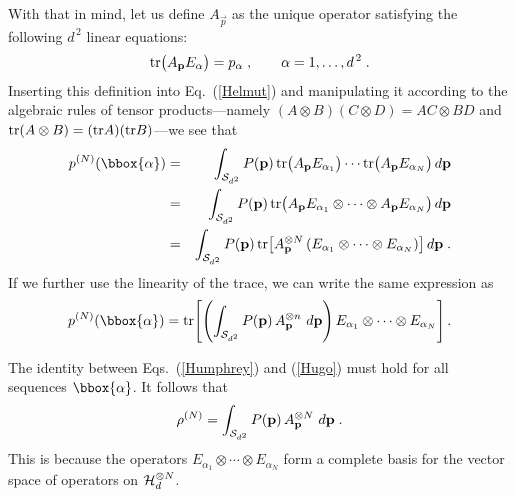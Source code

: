 With that in mind, let us define $A_{\vec{p}}$ as the unique
operator satisfying the following $d^{\,2}$ linear equations:
\begin{equation}
{\rm tr}\big(A_{\vec{p}}E_\alpha\big)=
p_\alpha\;,\quad\quad\alpha=1,\ldots,d^{\,2}\;.
\label{Hamish}
\end{equation}
Inserting this definition into Eq.~(\ref{Helmut}) and manipulating it
according to the algebraic rules of tensor products---namely
$(A\otimes B)(C\otimes D)=AC\otimes BD$ and ${\rm tr}(A\otimes
B)=({\rm tr}A)({\rm tr}B)$---we see that
\begin{eqnarray}
p^{(N)}(\bbox{\alpha})
&=&
\int_{{\cal S}_{d^2}} P(\vec{p})\,{\rm
tr}\big(A_{\vec{p}}E_{\alpha_1}\big) \cdots {\rm
tr}\big(A_{\vec{p}}E_{\alpha_N}\big)\,d\vec{p}
\nonumber\\
&=&
\int_{{\cal S}_{d^2}} P(\vec{p})\,{\rm
tr}\big(A_{\vec{p}}E_{\alpha_1}\otimes \cdots\otimes
A_{\vec{p}}E_{\alpha_N}\big)\,d\vec{p}
\nonumber\\
&=&
\int_{{\cal S}_{d^2}} P(\vec{p})\,{\rm tr}\big[A_{\vec{p}}^{\otimes N}
\,
(E_{\alpha_1}\otimes\cdots\otimes E_{\alpha_N})\big]\,d\vec{p}\;.
\end{eqnarray}
If we further use the linearity of the trace, we can write the
same expression as
\begin{equation}
p^{(N)}(\bbox{\alpha})={\rm tr}\!\left[\left(\int_{{\cal S}_{d^2}}
P(\vec{p})\,A_{\vec{p}}^{\otimes n}
\,\,d\vec{p}\right)E_{\alpha_1}\otimes\cdots\otimes
E_{\alpha_N}\right].
\label{Hugo}
\end{equation}

The identity between Eqs.~(\ref{Humphrey}) and (\ref{Hugo}) must hold
for all sequences $\bbox{\alpha}$.  It follows that
\begin{equation}
\rho^{(N)}=\int_{{\cal S}_{d^2}} P(\vec{p})\,A_{\vec{p}}^{\otimes N}
\,\,d\vec{p}\;.
\label{Howard}
\end{equation}
This is because the operators $E_{\alpha_1}\otimes\cdots\otimes
E_{\alpha_N}$ form a complete basis for the vector space of
operators on ${\cal H}_d^{\otimes N}$.

